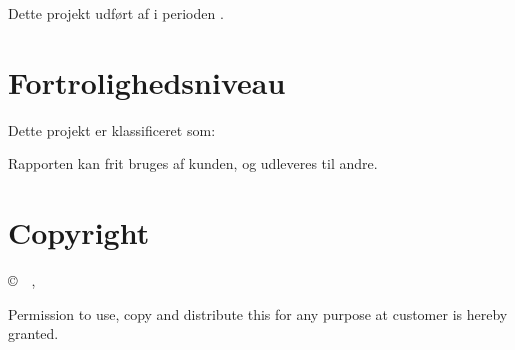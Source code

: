 \documentclass[a4paper,11pt,notitlepage]{report}
\begin{document}




\newcommand{\docnumber}{2019082201}


\mytitle{\projecttitle}{\customer}{}



\eject

\lfoot{}


\setcounter{tocdepth}{0}

\normal

\tableofcontents

\normal
\pagestyle{fancy}


\begin{versionhistory}
\end{versionhistory}

Dette projekt udført af \company i perioden \duration.

\section*{Fortrolighedsniveau}

Dette projekt er klassificeret som: \confidentiality

Rapporten kan frit bruges af kunden, og udleveres til andre.

\section*{Copyright}

\copyright\ \the\year\
\company \authorfirstname \authorsurname, \authoremail

Permission to use, copy and distribute this for any purpose at customer
is hereby granted.
\end{document}
